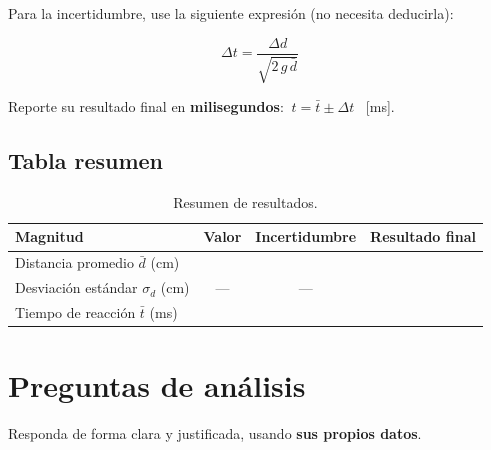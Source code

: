 \documentclass[11pt, letterpaper]{article}
\begin{document}
	\vspace{0.2cm}
	\noindent
	Para la incertidumbre, use la siguiente expresión (no necesita deducirla):
	
	\begin{equation}
	\Delta t = \frac{\Delta d}{\sqrt{2\,g\,\bar{d}}}
	\end{equation}
	
	\noindent
	Reporte su resultado final en \textbf{milisegundos}: $\ t = \bar{t} \pm \Delta t$ \ [ms].
	
	\subsection*{Tabla resumen}
	
	\begin{table}[h]
		\centering
		\small
		\renewcommand{\arraystretch}{1.5}
		\begin{tabular}{|l|c|c|c|}
			\hline
			\textbf{Magnitud} & \textbf{Valor} & \textbf{Incertidumbre} & \textbf{Resultado final} \\
			\hline
			Distancia promedio $\bar{d}$ (cm) & & & \\ \hline
			Desviación estándar $\sigma_d$ (cm) & --- & --- & \\ \hline
			Tiempo de reacción $\bar{t}$ (ms) & & & \\ \hline
		\end{tabular}
		\caption{Resumen de resultados.}
	\end{table}
	
	\section{Preguntas de análisis}
	
	Responda de forma clara y justificada, usando \textbf{sus propios datos}.
	
\end{document}

